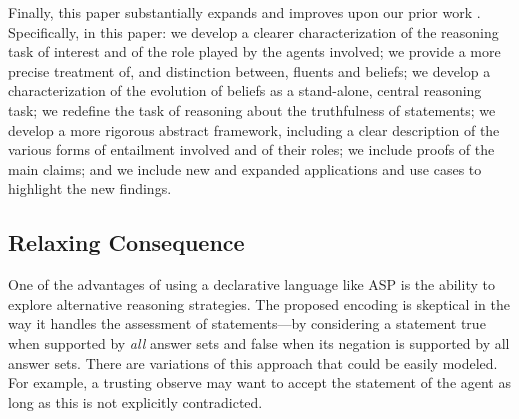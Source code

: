 \documentclass{article}
\newcommand{\memo}[1]{
  \ifthenelse {\boolean{includeMemo}}{\medskip\noindent\fbox{\begin{minipage}[b]{\dimexpr\linewidth-1em}#1\end{minipage}}\medskip\newline} 
}
\begin{document}
Finally, this paper substantially expands and improves upon our prior work \cite{spg16,spg16b}. Specifically, in this paper:
we develop a clearer characterization of the reasoning task of interest and of the role played by the agents involved;
we provide a more precise treatment of, and distinction between, fluents and beliefs;
we develop a characterization of the evolution of beliefs as a stand-alone, central reasoning task;
we redefine the task of reasoning about the truthfulness of statements;
we develop a more rigorous abstract framework, including a clear description of the various forms of entailment involved and of their roles;
we include proofs of the main claims; and
we include new and expanded applications and use cases to highlight the new findings.

  
\iffalse  
 
\subsection{Relaxing Consequence} 
One of the advantages of using a declarative language like ASP is the ability
to explore alternative reasoning strategies. The proposed encoding is skeptical in 
the way it handles the assessment of statements---by considering a statement true when
supported by \emph{all} answer sets and false when its negation is supported by
all answer sets. There are variations of this approach that could be easily modeled. For example,
a trusting observe may want to accept the statement of the agent as long as this is not
explicitly contradicted.
\end{document}
